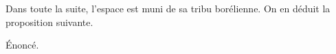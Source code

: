 Dans toute la suite, l'espace est muni de sa tribu borélienne. On en déduit
la proposition suivante.
\begin{proposition} %
  Énoncé.
\end{proposition}
